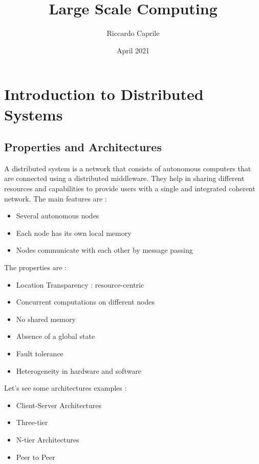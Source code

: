 \documentclass{article}
\title{Large Scale Computing}
\author{Riccardo Caprile}
\date{April 2021}
\begin{document}
\tableofcontents
\maketitle

\section{Introduction to Distributed Systems}
\subsection{Properties and Architectures}
A distributed system is a network that consists of autonomous computers that are connected using a distributed middleware.
They help in sharing different resources and capabilities to provide users with a single and integrated coherent network.
\vspace{3mm}
The main features are : 
\begin{itemize}
    \item Several autonomous nodes
    \item Each node has its own local memory
    \item Nodes communicate with each other by message passing
\end{itemize}

The properties are :
\begin{itemize}
    \item Location Transparency : resource-centric
    \item Concurrent computations on different nodes
    \item No shared memory
    \item Absence of a global state
    \item Fault tolerance 
    \item Heterogeneity in hardware and software
\end{itemize}

Let's see some architectures examples :
\begin{itemize}
    \item Client-Server Architectures 
    \item Three-tier 
    \item N-tier Architectures 
    \item Peer to Peer 
\end{itemize}
\end{document}
